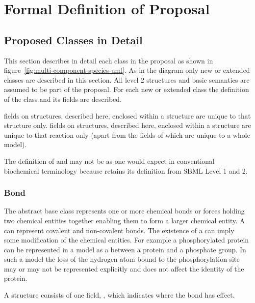\documentclass{cekarticle}
\begin{document}
\clearpage

\section{Formal Definition of Proposal}
\label{sec:definitions}

\subsection{Proposed Classes in Detail}
This section describes in detail each class in the proposal as shown in
figure~\ref{fig:multi-component-species-uml}.
As in the diagram only new or extended classes are described in this section.
All level 2 structures and basic semantics are assumed to be part of the proposal.
For each new or extended class the definition of the class and its fields are described.

 fields on structures, described here, enclosed within a  structure
are unique to that structure only.
 fields on structures, described here, enclosed within a  structure are
unique to that reaction only (apart from the  fields of 
which are unique to a whole model).

The definition of  and  may not be as one would
expect in conventional biochemical terminology because  retains its definition
from SBML Level 1 and 2.

\subsubsection{Bond}

The abstract base class  represents one or more chemical bonds or forces holding two chemical
entities together enabling them to form a larger chemical entity.  A  can represent
covalent and non-covalent bonds.  The existence of a  can imply some
modification of the chemical entities.  For example a phosphorylated protein can be represented
in a model as a  between a protein and a phosphate group.  In such a model
the loss of the hydrogen atom bound to the phosphorylation site may or may not be represented
explicitly and does not affect the identity of the protein.  

A  structure consists of one  field,
, which indicates where the bond has effect.
\end{document}
